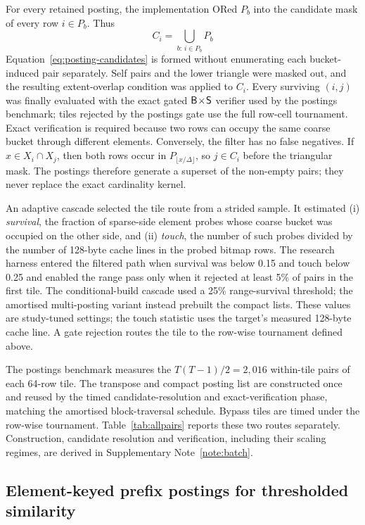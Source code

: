 For every retained posting, the implementation ORed $P_b$ into the candidate mask of every row
$i\in P_b$. Thus
\begin{equation}
C_i=\bigcup_{b:\,i\in P_b}P_b
\label{eq:posting-candidates}
\end{equation}
Equation~\eqref{eq:posting-candidates} is formed without enumerating each bucket-induced pair
separately. Self pairs and the lower triangle
were masked out, and the resulting extent-overlap condition was applied to $C_i$. Every surviving
$(i,j)$ was finally evaluated with the exact gated $\textsf{B}\!\times\!\textsf{S}$ verifier used by the postings
benchmark; tiles rejected by the postings gate use the full row-cell tournament. Exact verification
is required because two rows can
occupy the same coarse bucket through different elements. Conversely, the filter has no false
negatives. If
$x\in X_i\cap X_j$, then both rows occur in $P_{\lfloor x/\Delta\rfloor}$, so $j\in C_i$ before the
triangular mask. The postings therefore generate a superset of the non-empty pairs; they never
replace the exact cardinality kernel.

An adaptive cascade selected the tile route from a strided sample. It estimated (i) \emph{survival},
the fraction of sparse-side element
probes whose coarse bucket was occupied on the other side, and (ii) \emph{touch}, the number of such
probes divided by the number of 128-byte cache lines in the probed bitmap rows. The research harness
entered the filtered path when survival was below 0.15 and touch below 0.25 and enabled the range pass
only when it rejected at least 5\% of pairs in the first tile. The conditional-build cascade used a
25\% range-survival threshold; the amortised multi-posting variant instead prebuilt the compact lists.
These values are study-tuned settings; the touch statistic uses the target's measured 128-byte cache
line. A gate rejection routes the tile to the row-wise tournament defined above.

The postings benchmark measures the $T(T-1)/2=2{,}016$ within-tile pairs of each 64-row tile. The
transpose and compact posting list are constructed once and reused by the timed candidate-resolution
and exact-verification phase, matching the amortised block-traversal schedule. Bypass tiles are timed
under the row-wise tournament. Table~\ref{tab:allpairs} reports these two routes separately.
Construction, candidate resolution and verification, including their scaling regimes, are derived
in Supplementary Note~\ref{note:batch}.

\subsection*{Element-keyed prefix postings for thresholded similarity}

